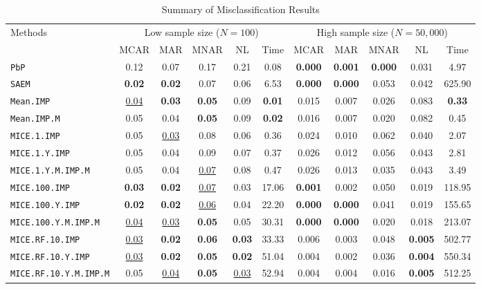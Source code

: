 \begin{table}[h!]
\centering
\begin{tabular}{l cccc c cccc c}
\toprule
\multirow{2}{*}{Methods}
& \multicolumn{5}{c}{Low sample size ($N=100$)} & \multicolumn{5}{c}{High sample size ($N=50,000$)} \\
\cmidrule(lr){2-6} \cmidrule(lr){7-11}
& MCAR & MAR & MNAR & NL & Time & MCAR & MAR & MNAR & NL & Time \\
\midrule
\texttt{PbP} & 0.12 & 0.07 & 0.17 & 0.21 & 0.08 & \textbf{0.000} & \textbf{0.001} & \textbf{0.000} & 0.031 & 4.97 \\
\texttt{SAEM} & \textbf{0.02} & \textbf{0.02} & 0.07 & 0.06 & 6.53 & \textbf{0.000} & \textbf{0.000} & 0.053 & 0.042 & 625.90 \\
\texttt{Mean.IMP} & \underline{0.04} & \textbf{0.03} & \textbf{0.05} & 0.09 & \textbf{0.01} & 0.015 & 0.007 & 0.026 & 0.083 & \textbf{0.33} \\
\texttt{Mean.IMP.M} & 0.05 & 0.04 & \textbf{0.05} & 0.09 & \textbf{0.02} & 0.016 & 0.007 & 0.020 & 0.082 & 0.45 \\
\texttt{MICE.1.IMP} & 0.05 & \underline{0.03} & 0.08 & 0.06 & 0.36 & 0.024 & 0.010 & 0.062 & 0.040 & 2.07 \\
\texttt{MICE.1.Y.IMP} & 0.05 & 0.04 & 0.09 & 0.07 & 0.37 & 0.026 & 0.012 & 0.056 & 0.043 & 2.81 \\
\texttt{MICE.1.Y.M.IMP.M} & 0.05 & 0.04 & \underline{0.07} & 0.08 & 0.47 & 0.026 & 0.013 & 0.035 & 0.043 & 3.49 \\
\texttt{MICE.100.IMP} & \textbf{0.03} & \textbf{0.02} & \underline{0.07} & 0.03 & 17.06 & \textbf{0.001} & 0.002 & 0.050 & 0.019 & 118.95 \\
\texttt{MICE.100.Y.IMP} & \textbf{0.02} & \textbf{0.02} & \underline{0.06} & 0.04 & 22.20 & \textbf{0.000} & \textbf{0.000} & 0.041 & 0.019 & 155.65 \\
\texttt{MICE.100.Y.M.IMP.M} & \underline{0.04} & \underline{0.03} & \textbf{0.05} & 0.05 & 30.31 & \textbf{0.000} & \textbf{0.000} & 0.020 & 0.018 & 213.07 \\
\texttt{MICE.RF.10.IMP} & \underline{0.03} & \textbf{0.02} & \textbf{0.06} & \textbf{0.03} & 33.33 & 0.006 & 0.003 & 0.048 & \textbf{0.005} & 502.77 \\
\texttt{MICE.RF.10.Y.IMP} & \underline{0.03} & \textbf{0.02} & \textbf{0.05} & \textbf{0.02} & 51.04 & 0.004 & 0.002 & 0.036 & \textbf{0.004} & 550.34 \\
\texttt{MICE.RF.10.Y.M.IMP.M} & 0.05 & \underline{0.04} & \textbf{0.05} & \underline{0.03} & 52.94 & 0.004 & 0.004 & 0.016 & \textbf{0.005} & 512.25 \\
\bottomrule
\end{tabular}
\caption{Summary of Misclassification Results}
\label{tab:misclassification_summary}
\end{table}
